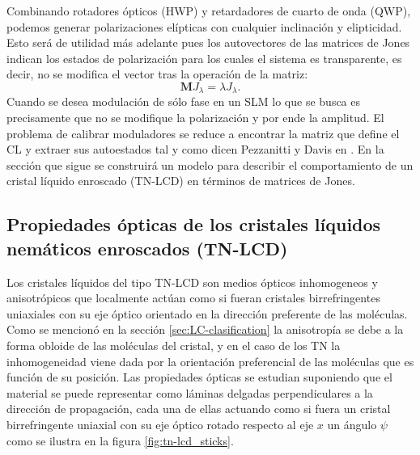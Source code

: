 Combinando rotadores ópticos (HWP) y retardadores de cuarto de onda (QWP),
podemos generar polarizaciones elípticas con cualquier inclinación y
elipticidad. Esto será de utilidad más adelante pues los autovectores
de las matrices de Jones indican los estados de polarización para los
cuales el sistema es transparente, es decir, no se modifica el vector
tras la operación de la matriz:
\[\mathbf{M}J_{\lambda} = \lambda J_{\lambda}.\]
Cuando se desea modulación de sólo fase en un SLM lo que se busca es
precisamente que no se modifique la polarización y por ende la
amplitud. El problema de calibrar moduladores se reduce a encontrar la
matriz que define el CL y extraer sus autoestados tal y como dicen
Pezzanitti y Davis en .
En la sección que sigue se construirá un modelo para describir el
comportamiento de un cristal líquido enroscado (TN-LCD) en términos de
matrices de Jones.

\subsection{Propiedades ópticas de los cristales líquidos nemáticos enroscados (TN-LCD)}

Los cristales líquidos del tipo TN-LCD son medios ópticos inhomogeneos
y anisotrópicos que localmente actúan como si fueran cristales
birrefringentes uniaxiales con su eje óptico orientado en la dirección
preferente de las moléculas. Como se mencionó en la sección
\ref{sec:LC-clasification} la anisotropía se debe a la forma obloide
de las moléculas del cristal, y en el caso de los TN la inhomogeneidad
viene dada por la orientación preferencial de las moléculas que es
función de su posición. Las propiedades ópticas se estudian suponiendo
que el material se puede representar como láminas delgadas perpendiculares a la
dirección de propagación, cada una de ellas actuando como si fuera un
cristal birrefringente uniaxial con su eje óptico rotado respecto al eje $x$ un ángulo
$\psi$ como se ilustra en la figura
\ref{fig:tn-lcd_sticks}.  

